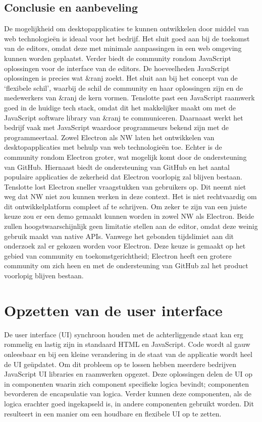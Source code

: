 \subsection{Conclusie en aanbeveling}
De mogelijkheid om desktopapplicaties te kunnen ontwikkelen door middel van web technologieën is ideaal voor het bedrijf. Het sluit goed aan bij de toekomst van de editors, omdat deze met minimale aanpassingen in een web omgeving kunnen worden geplaatst. Verder biedt de community rondom JavaScript oplossingen voor de interface van de editors. De hoeveelheden JavaScript oplossingen is precies wat \&ranj zoekt. Het sluit aan bij het concept van de ‘flexibele schil’, waarbij de schil de community en haar oplossingen zijn en de medewerkers van \&ranj de kern vormen. Tenslotte past een JavaScript raamwerk goed in de huidige tech stack, omdat dit het makkelijker maakt om met de JavaScript software library van \&ranj te communiceren. Daarnaast werkt het bedrijf vaak met JavaScript waardoor programmeurs bekend zijn met de programmeertaal.
Zowel Electron als NW laten het ontwikkelen van desktopapplicaties met behulp van web technologieën toe. Echter is de community rondom Electron groter, wat mogelijk komt door de ondersteuning van GitHub. Hiernaast biedt de ondersteuning van GitHub en het aantal populaire applicaties de zekerheid dat Electron voorlopig zal blijven bestaan. Tenslotte lost Electron sneller vraagstukken van gebruikers op.
Dit neemt niet weg dat NW niet zou kunnen werken in deze context. Het is niet rechtvaardig om dit ontwikkelplatform compleet af te schrijven. Om zeker te zijn van een juiste keuze zou er een demo gemaakt kunnen worden in zowel NW als Electron. Beide zullen hoogstwaarschijnlijk geen limitatie stellen aan de editor, omdat deze weinig gebruik maakt van native APIs. Vanwege het gebonden tijdslimiet aan dit onderzoek zal er gekozen worden voor Electron. Deze keuze is gemaakt op het gebied van community en toekomstgerichtheid; Electron heeft een grotere community om zich heen en met de ondersteuning van GitHub zal het product voorlopig blijven bestaan.

\section{Opzetten van de user interface}
De user interface (UI) synchroon houden met de achterliggende staat kan erg rommelig en lastig zijn in standaard HTML en JavaScript. Code wordt al gauw onleesbaar en bij een kleine verandering in de staat van de applicatie wordt heel de UI geüpdatet. Om dit probleem op te lossen hebben meerdere bedrijven JavaScript UI libraries en raamwerken opgezet. Deze oplossingen delen de UI op in componenten waarin zich component specifieke logica bevindt; componenten bevorderen de encapsulatie van logica. Verder kunnen deze componenten, als de logica erachter goed ingekapseld is, in andere componenten gebruikt worden. Dit resulteert in een manier om een houdbare en flexibele UI op te zetten.

